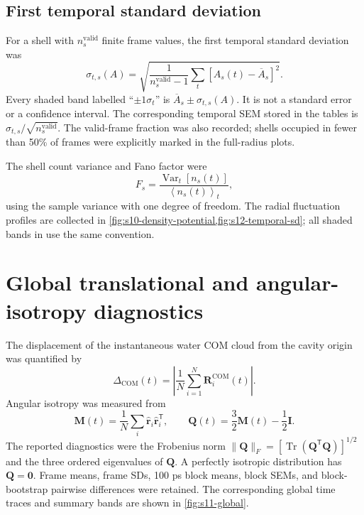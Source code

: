 \documentclass[11pt]{article}
\newcommand{\COM}{\mathrm{COM}}
\newcommand{\mean}[1]{\left\langle #1\right\rangle}
\begin{document}
\subsection{First temporal standard deviation}

For a shell with \(n_s^{\mathrm{valid}}\) finite frame values, the first
temporal standard deviation was
\begin{equation}
 \sigma_{t,s}(A)=
 \sqrt{\frac{1}{n_s^{\mathrm{valid}}-1}
 \sum_{t}\left[A_s(t)-\overline A_s\right]^2}.
 \label{eq:temporal-sd}
\end{equation}
Every shaded band labelled ``\(\pm1\sigma_t\)'' is
\(\overline A_s\pm\sigma_{t,s}(A)\).  It is not a standard error or a
confidence interval.  The corresponding temporal SEM stored in the tables is
\(\sigma_{t,s}/\sqrt{n_s^{\mathrm{valid}}}\).  The valid-frame fraction was
also recorded; shells occupied in fewer than 50\% of frames were explicitly
marked in the full-radius plots.

The shell count variance and Fano factor were
\begin{equation}
 F_s=\frac{\operatorname{Var}_t[n_s(t)]}{\mean{n_s(t)}_t},
 \label{eq:fano}
\end{equation}
using the sample variance with one degree of freedom.
The radial fluctuation profiles are collected in
\cref{fig:s10-density-potential,fig:s12-temporal-sd}; all shaded bands in
 use the same convention.

\section{Global translational and angular-isotropy diagnostics}

The displacement of the instantaneous water COM cloud from the cavity origin
was quantified by
\begin{equation}
 \Delta_{\COM}(t)=
 \left|\frac{1}{N}\sum_{i=1}^{N}\bm R_i^{\COM}(t)\right|.
 \label{eq:global-com}
\end{equation}
Angular isotropy was measured from
\begin{equation}
 \bm M(t)=\frac1N\sum_i\hat{\bm r}_i\hat{\bm r}_i^{\mathsf T},
 \qquad
 \bm Q(t)=\frac32\bm M(t)-\frac12\bm I.
 \label{eq:q-tensor}
\end{equation}
The reported diagnostics were the Frobenius norm
\(\|\bm Q\|_F=[\operatorname{Tr}(\bm Q^{\mathsf T}\bm Q)]^{1/2}\) and the
three ordered eigenvalues of \(\bm Q\).  A perfectly isotropic distribution
has \(\bm Q=\bm 0\).  Frame means, frame SDs, 100 ps block means, block SEMs,
and block-bootstrap pairwise differences were retained.
The corresponding global time traces and summary bands are shown in
\cref{fig:s11-global}.
\end{document}
